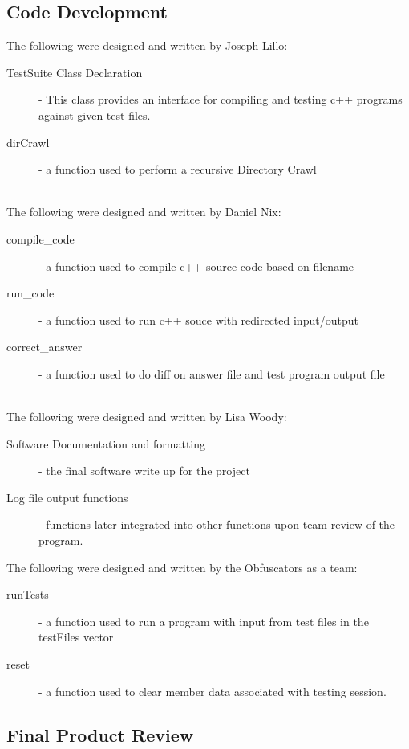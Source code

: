 \subsection{Code Development}
The following were designed and written by Joseph Lillo:
\begin{description}
\item [TestSuite Class Declaration]- This class provides an interface for compiling and testing c++ programs against given test files.
\item [dirCrawl] - a function used to perform a recursive Directory Crawl \\ \\
\end{description}
The following were designed and written by Daniel Nix:
\begin{description}
\item [compile\_code] - a function used to compile c++ source code based on filename
\item [run\_code]- a function used to run c++ souce with redirected input/output
\item [correct\_answer]- a function used to do diff on answer file and test program output file \\  \\
\end{description}
The following were designed and written by Lisa Woody:
\begin{description}
\item [Software Documentation and formatting] - the final software write up for the project
\item [Log file output functions]-  functions later integrated into other functions upon team review of the program. \\
\end{description}
The following were designed and written by the Obfuscators as a team:
\begin{description}
\item [runTests] - a function used to run a program with input from test files in the testFiles vector
\item [reset]-  a function used to clear member data associated with testing session.
\end{description}




\subsection{Final Product Review}

